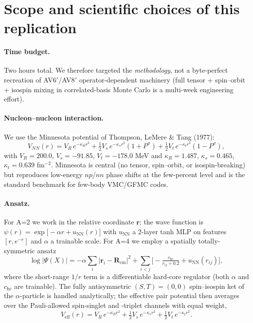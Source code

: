 \documentclass[11pt]{article}
\begin{document}
\section{Scope and scientific choices of this replication}

\paragraph{Time budget.} Two hours total. We therefore targeted the
\emph{methodology}, not a byte-perfect recreation of AV6$'$/AV8$'$
operator-dependent machinery (full tensor + spin--orbit + isospin mixing in
correlated-basis Monte Carlo is a multi-week engineering effort).

\paragraph{Nucleon--nucleon interaction.} We use the Minnesota potential of
Thompson, LeMere \& Tang (1977):
\begin{equation}
  V_{NN}(r) = V_{R}\,e^{-\kappa_{R}r^{2}}
           + \tfrac{1}{2}V_{s}\,e^{-\kappa_{s}r^{2}}(1{+}P^{\sigma})
           + \tfrac{1}{2}V_{t}\,e^{-\kappa_{t}r^{2}}(1{-}P^{\sigma}),
  \label{eq:minnesota}
\end{equation}
with $V_{R}=200.0$, $V_{s}=-91.85$, $V_{t}=-178.0$ MeV and
$\kappa_{R}=1.487$, $\kappa_{s}=0.465$, $\kappa_{t}=0.639$ fm$^{-2}$. Minnesota
is central (no tensor, spin--orbit, or isospin-breaking) but reproduces
low-energy $np$/$nn$ phase shifts at the few-percent level and is the standard
benchmark for few-body VMC/GFMC codes.

\paragraph{Ansatz.} For A=2 we work in the relative coordinate $\mathbf r$; the
wave function is $\psi(r) = \exp\!\big[-\alpha r + u_{\mathrm{NN}}(r)\big]$
with $u_{\mathrm{NN}}$ a 2-layer tanh MLP on features $[r,e^{-r}]$ and $\alpha$
a trainable scale. For A=4 we employ a spatially totally-symmetric ansatz
\begin{equation}
  \log|\Psi(X)| = -\alpha\sum_{i}|\mathbf r_{i}-\mathbf R_{\mathrm{cm}}|^{2}
             + \sum_{i<j}\Big[-\tfrac{c_{\mathrm{hc}}}{r_{ij}+0.2}
                              + u_{\mathrm{NN}}(r_{ij})\Big],
\end{equation}
where the short-range $1/r$ term is a differentiable hard-core regulator (both
$\alpha$ and $c_{\mathrm{hc}}$ are trainable). The fully antisymmetric
$(S,T)=(0,0)$ spin--isospin ket of the $\alpha$-particle is handled
analytically; the effective pair potential then averages over the Pauli-allowed
spin-singlet and -triplet channels with equal weight,
\begin{equation}
  V_{\mathrm{eff}}(r) =
  V_{R}\,e^{-\kappa_{R}r^{2}}
  + \tfrac{1}{2}V_{s}\,e^{-\kappa_{s}r^{2}}
  + \tfrac{1}{2}V_{t}\,e^{-\kappa_{t}r^{2}}.
\end{equation}
\end{document}
